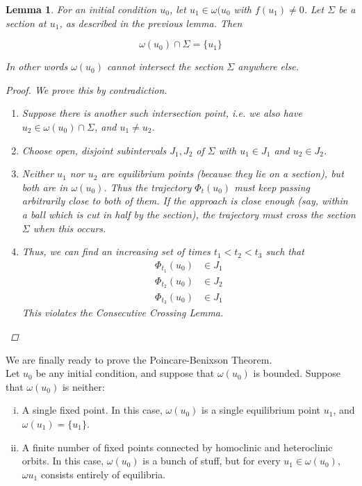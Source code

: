 \documentclass{article}
\newtheorem{lemma}[theorem]{Lemma}
\begin{document}
\begin{lemma}For an initial condition $u_0$, let $u_1 \in \omega(u_0$ with $f(u_1) \neq 0$. Let $\Sigma$ be a section at $u_1$, as described in the previous lemma. Then

\[
\omega(u_0) \cap \Sigma = \{ u_1 \}
\]

In other words $\omega(u_0)$ cannot intersect the section $\Sigma$ anywhere else.

\begin{proof}
We prove this by contradiction.
\begin{enumerate}
\item Suppose there is another such intersection point, i.e. we also have $u_2 \in \omega(u_0) \cap \Sigma$, and $u_1 \neq u_2$. 
\item Choose open, disjoint subintervals $J_1, J_2$ of $\Sigma$ with $u_1 \in J_1$ and $u_2 \in J_2$.
\item Neither $u_1$ nor $u_2$ are equilibrium points (because they lie on a section), but both are in $\omega(u_0)$. Thus the trajectory $\Phi_t(u_0)$ must keep passing arbitrarily close to both of them. If the approach is close enough (say, within a ball which is cut in half by the section), the trajectory must cross the section $\Sigma$ when this occurs.
\item Thus, we can find an increasing set of times $t_1 < t_2 < t_3$ such that
\begin{align*}
\Phi_{t_1}(u_0) &\in J_1 \\
\Phi_{t_2}(u_0) &\in J_2 \\
\Phi_{t_3}(u_0) &\in J_1
\end{align*}
This violates the Consecutive Crossing Lemma.
\end{enumerate}
\end{proof}
\end{lemma}

We are finally ready to prove the Poincare-Benixson Theorem.\\ 

Let $u_0$ be any initial condition, and suppose that $\omega(u_0)$ is bounded. Suppose that $\omega(u_0)$ is neither:

\begin{enumerate}[(i)]
\item A single fixed point. In this case, $\omega(u_0)$ is a single equilibrium point $u_1$, and $\omega(u_1) = \{ u_1 \}$.
\item A finite number of fixed points connected by homoclinic and heteroclinic orbits. In this case, $\omega(u_0)$ is a bunch of stuff, but for every $u_1 \in \omega(u_0)$, $\omega{u_1}$ consists entirely of equilibria.
\end{enumerate}
\end{document}
